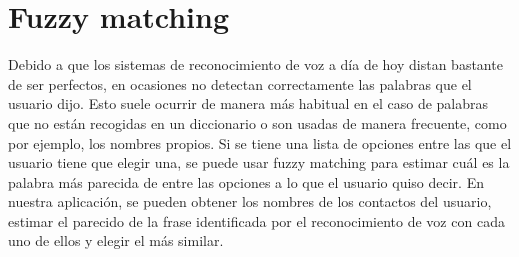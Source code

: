 \section{Fuzzy matching}
Debido a que los sistemas de reconocimiento de voz a día de hoy distan bastante de ser perfectos, en ocasiones no detectan correctamente las palabras que el usuario dijo. Esto suele ocurrir de manera más habitual en el caso de palabras que no están recogidas en un diccionario o son usadas de manera frecuente, como por ejemplo, los nombres propios. Si se tiene una lista de opciones entre las que el usuario tiene que elegir una, se puede usar fuzzy matching para estimar cuál es la palabra más parecida de entre las opciones a lo que el usuario quiso decir. En nuestra aplicación, se pueden obtener los nombres de los contactos del usuario, estimar el parecido de la frase identificada por el reconocimiento de voz con cada uno de ellos y elegir el más similar.